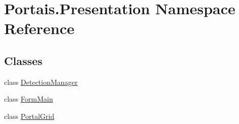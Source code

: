 \hypertarget{namespace_portais_1_1_presentation}{}\section{Portais.\+Presentation Namespace Reference}
\label{namespace_portais_1_1_presentation}
\subsection*{Classes}
\begin{DoxyCompactItemize}
\item 
class \hyperlink{class_portais_1_1_presentation_1_1_detection_manager}{Detection\+Manager}
\item 
class \hyperlink{class_portais_1_1_presentation_1_1_form_main}{Form\+Main}
\item 
class \hyperlink{class_portais_1_1_presentation_1_1_portal_grid}{Portal\+Grid}
\end{DoxyCompactItemize}
